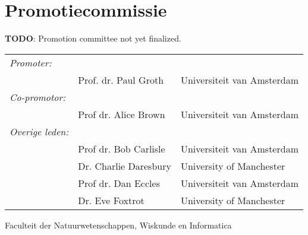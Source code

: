\newpage

\section*{Promotiecommissie}

\textbf{TODO}: Promotion committee not yet finalized.

\begin{tabular}{lll}
\textit{Promoter:}  &  & \\
     & Prof. dr. Paul Groth     & Universiteit van Amsterdam \\
\textit{Co-promotor:} & & \\     
     &  Prof dr. Alice Brown    & Universiteit van Amsterdam \\
\textit{Overige leden:} & & \\
     &  Prof dr. Bob Carlisle   & Universiteit van Amsterdam \\
     &  Dr. Charlie Daresbury   & University of Manchester  \\     
     &  Prof dr. Dan Eccles     & Universiteit van Amsterdam \\
     &  Dr. Eve Foxtrot         & University of Manchester  \\     
\end{tabular}

Faculteit der Natuurwetenschappen, Wiskunde en Informatica
